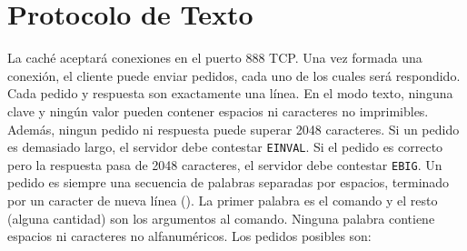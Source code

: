 \documentclass[tp]{lcc}
\begin{document}
\section{Protocolo de Texto}

La caché aceptará conexiones en el puerto 888 TCP.
%
Una vez formada una conexión, el cliente puede enviar pedidos, cada
uno de los cuales será respondido.
%
Cada pedido y respuesta son exactamente una línea. En el modo texto, ninguna
clave y ningún valor pueden contener espacios ni caracteres no imprimibles.
Además, ningun pedido ni respuesta puede superar 2048 caracteres.
Si un pedido es demasiado largo, el servidor debe contestar \texttt{EINVAL}.
Si el pedido es correcto pero la respuesta pasa de 2048 caracteres, el servidor
debe contestar \texttt{EBIG}.
%
Un pedido es siempre una secuencia de palabras separadas por
espacios, terminado por un caracter de nueva línea ().
%
La primer palabra es el comando y el resto (alguna cantidad) son los
argumentos al comando.
%
Ninguna palabra contiene espacios ni caracteres no alfanuméricos.
%
Los pedidos posibles son:
\end{document}
